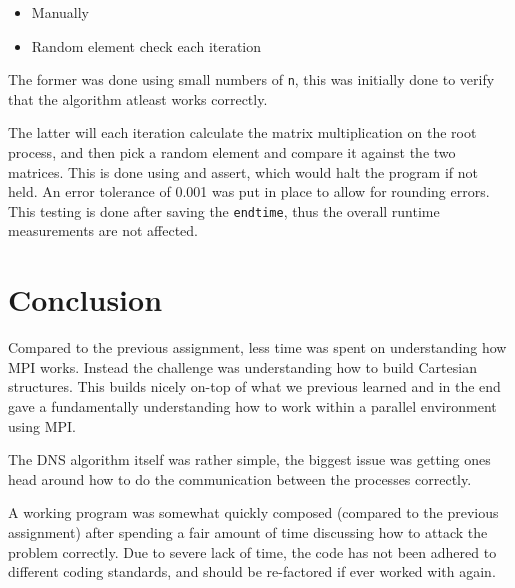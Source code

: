\documentclass[a4paper,11pt,oneside]{book}
\begin{document}
\begin{itemize}
\item Manually
\item Random element check each iteration
\end{itemize}

The former was done using small numbers of \verb!n!, this was initially done to verify that the algorithm atleast works correctly.

The latter will each iteration calculate the matrix multiplication on the root process, and then pick a random element and compare it against the two matrices. This is done using and assert, which would halt the program if not held. An error tolerance of 0.001 was put in place to allow for rounding errors.
This testing is done after saving the \verb!endtime!, thus the overall runtime measurements are not affected.

\chapter{Conclusion}
Compared to the previous assignment, less time was spent on understanding how MPI works. Instead the challenge was understanding how to build Cartesian structures. This builds nicely on-top of what we previous learned and in the end gave a fundamentally understanding how to work within a parallel environment using MPI.

The DNS algorithm itself was rather simple, the biggest issue was getting ones head around how to do the communication between the processes correctly.

A working program was somewhat quickly composed (compared to the previous assignment) after spending a fair amount of time discussing how to attack the problem correctly. Due to severe lack of time, the code has not been adhered to different coding standards, and should be re-factored if ever worked with again.


\end{document}
